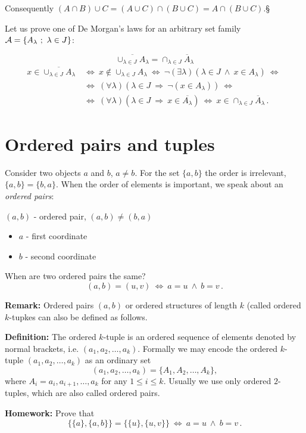 \documentclass[11pt,paper=b5,footinclude,headinclude]{scrbook} %
\def\inn {{~\wedge~}}
\def\sledi {{~\Rightarrow~}}
\def\cee {{~\Leftrightarrow~}}
\def\kz{{\hfill{\S}}}%
\theoremstyle{remark}
\theoremstyle{definition} %
\theoremstyle{theorem} %
\begin{document}
Consequently
$(A\cap B)\cup C = (A\cup C)\cap (B\cup C) = A\cap (B\cup C)$.\kz


\bigskip

Let us prove one of De Morgan's laws for an arbitrary set family
${\cal A} = \{A_\lambda~;~\lambda\in J\}$:

$$\overline{\cup_{\lambda\in J}A_\lambda} = {\cap_{\lambda\in J}\overline A_\lambda}$$
\begin{align*}
    x\in \overline{\cup_{\lambda\in J}A_\lambda}
& \cee
x\not\in \cup_{\lambda\in J}A_\lambda
\cee
\neg(\exists \lambda)(\lambda \in J\inn x\in A_\lambda)
\cee 
\\
&\cee(\forall \lambda)(\lambda \in J\sledi \neg(x\in A_\lambda))
\cee \\
& \cee
(\forall \lambda)(\lambda \in J\sledi x\in \overline{A_\lambda})
\cee
x\in {\cap_{\lambda\in J}\overline A_\lambda}\,.
\end{align*}

\section{Ordered pairs and tuples}

Consider two objects $a$ and $b$, $a\neq b$.
For the set $\{a,b\}$ the order is irrelevant, $\{a,b\} = \{b,a\}$.
When the order of elements is important, we speak about an {\em ordered pairs}:

$(a,b)$ - ordered pair, $(a,b)\neq (b,a)$
\begin{itemize}
    \item $a$ - first coordinate
    \item $b$ - second coordinate
\end{itemize}
When are two ordered pairs the same?
$$(a,b) = (u,v) \cee a = u \inn b = v\,.$$

\medskip
\textbf{ Remark:}
Ordered pairs $(a,b)$ or ordered structures of length $k$ (called ordered $k$-tupkes can also be defined as follows.
\medskip

\textbf{Definition:} 
The ordered $k$-tuple is an ordered sequence of elements denoted by normal brackets, i.e. $(a_1,a_2,\dots,a_k)$.
Formally we may encode the ordered $k$-tuple $(a_1,a_2,\dots,a_k)$ as an ordinary set
\[
(a_1,a_2,\dots,a_k)=\{A_1,A_2,\dots,A_k\},
\]
where $A_i={a_i,a_{i+1},\dots,a_k}$ for any $1\le i\le k$. 
Usually we use only ordered $2$-tuples, which are also called ordered pairs.

\medskip
\textbf{ Homework:}
Prove that $$\{\{a\},\{a,b\}\} = \{\{u\},\{u,v\}\}\cee a = u \inn b = v\,.$$
\end{document}
